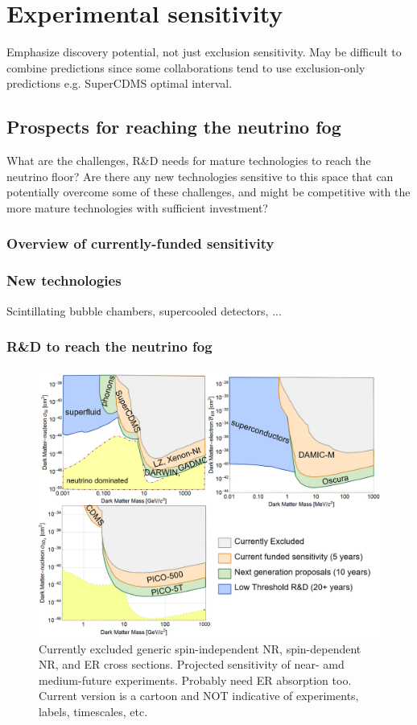 \section{Experimental sensitivity}
\label{sec:experiment}

Emphasize discovery potential, not just exclusion sensitivity. May be difficult to combine predictions since some collaborations tend to use exclusion-only predictions e.g. SuperCDMS optimal interval. 

\subsection{Prospects for reaching the neutrino fog}
What are the challenges, R\&D needs for mature technologies to reach the neutrino floor?  Are there any new technologies sensitive to this space that can potentially overcome some of these challenges, and might be competitive with the more mature technologies with sufficient investment?
\subsubsection{Overview of currently-funded sensitivity}


\subsubsection{New technologies}
Scintillating bubble chambers, supercooled detectors, ...
\subsubsection{R\&D to reach the neutrino fog}

\begin{figure}
    \centering
    \includegraphics[width=\textwidth]{figures/wimp_sensitivty_cartoon.png}
    \caption{Currently excluded generic spin-independent NR, spin-dependent NR, and ER cross sections. Projected sensitivity of near- amd medium-future experiments. Probably need ER absorption too. Current version is a cartoon and NOT indicative of experiments, labels, timescales, etc.}
    \label{fig:si_sensitivity}
\end{figure}

